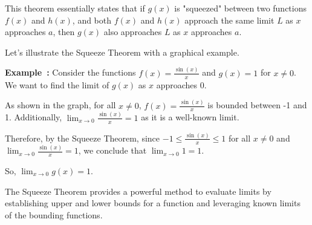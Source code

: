 \documentclass[a4paper,12pt]{book}
\newcounter{example}
\newenvironment{example}[1][\theexample]
  {\refstepcounter{example}\par\medskip\noindent\textbf{Example~#1:} \rmfamily}
  {\medskip}
\begin{document}
This theorem essentially states that if \( g(x) \) is "squeezed" between two functions \( f(x) \) and \( h(x) \), and both \( f(x) \) and \( h(x) \) approach the same limit \( L \) as \( x \) approaches \( a \), then \( g(x) \) also approaches \( L \) as \( x \) approaches \( a \).

Let's illustrate the Squeeze Theorem with a graphical example.

\begin{example}
Consider the functions \( f(x) = \frac{\sin(x)}{x} \) and \( g(x) = 1 \) for \( x \neq 0 \). We want to find the limit of \( g(x) \) as \( x \) approaches 0.

\begin{center}
\end{center}


As shown in the graph, for all \( x \neq 0 \), \( f(x) = \frac{\sin(x)}{x} \) is bounded between -1 and 1. Additionally, \( \lim_{{x \to 0}} \frac{\sin(x)}{x} = 1 \) as it is a well-known limit.

Therefore, by the Squeeze Theorem, since \( -1 \leq \frac{\sin(x)}{x} \leq 1 \) for all \( x \neq 0 \) and \( \lim_{{x \to 0}} \frac{\sin(x)}{x} = 1 \), we conclude that \( \lim_{{x \to 0}} 1 = 1 \).

So, \( \lim_{{x \to 0}} g(x) = 1 \).
\end{example}

The Squeeze Theorem provides a powerful method to evaluate limits by establishing upper and lower bounds for a function and leveraging known limits of the bounding functions.
\end{document}

